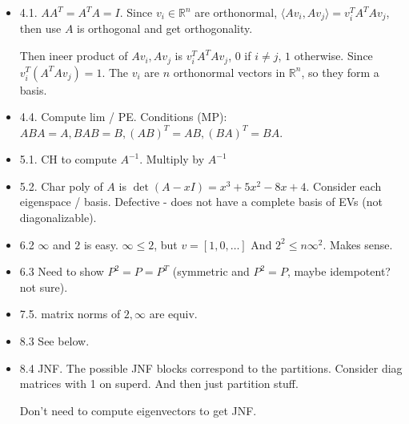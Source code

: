 \documentclass{article}
\newcommand{\RR}{\mathbb{R}}
\begin{document}
\begin{itemize}
  \item 4.1.  $A A^T = A^T A = I$.  Since $v_i \in \RR^n$ are orthonormal, $\langle A v_i, A v_j\rangle = v_i^T A^T A v_j$, then use $A$ is orthogonal and get orthogonality.

    Then ineer product of $Av_i, Av_j$ is $v_i^T A^T A v_j$, $0$ if $i \neq j$, $1$ otherwise.  Since $v_i^T (A^T A v_j) = 1$.  The $v_i$ are $n$ orthonormal vectors in $\RR^n$, so they form a basis.
  \item 4.4.  Compute lim / PE.  Conditions (MP): $ABA = A, BAB = B, (AB)^T = AB, (BA)^T = BA$.
  \item 5.1. CH to compute $A^{-1}$.  Multiply by $A^{-1}$
  \item 5.2.  Char poly of $A$ is $\det (A - x I) = x^3 + 5x^2 - 8 x + 4$.  Consider each eigenspace / basis.  Defective - does not have a complete basis of EVs (not diagonalizable).
  \item 6.2 $\infty$ and $2$ is easy. $ \infty \leq 2$, but $v = [1, 0, \dots]$  And  $2^2 \leq n \infty^2$.  Makes sense.
  \item 6.3  Need to show $P^2 = P = P^T$ (symmetric and $P^2 = P$, maybe idempotent?  not sure).
  \item 7.5. matrix norms of $2, \infty$ are equiv. 
  \item 8.3 See below.
  \item 8.4 JNF.  The possible JNF blocks correspond to the partitions.  Consider diag matrices with 1 on superd.  And then just partition stuff.

    Don't need to compute eigenvectors to get JNF.

\end{itemize}
\end{document}
